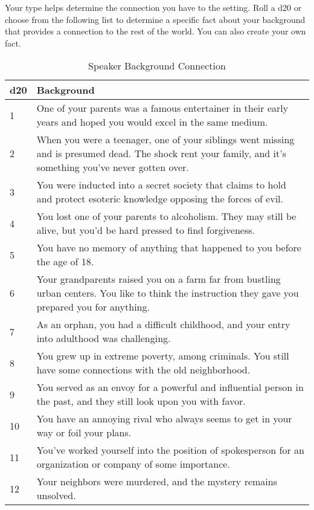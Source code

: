Your type helps determine the connection you have to the setting. Roll a d20 or choose from the following list to determine a specific fact about your background that provides a connection to the rest of the world. You can also create your own fact.

\begin{table*}
\centering

\caption{Speaker Background Connection}
\label{tab:Speaker Background Connection}

\begin{tabularx}{\textwidth}{| p{} | p{} |}
\hline
\textbf{d20} & \textbf{Background} \\
\hline
1 & One of your parents was a famous entertainer in their early years and hoped you would excel in the same medium. \\ \hline
2 & When you were a teenager, one of your siblings went missing and is presumed dead. The shock rent your family, and it’s something you’ve never gotten over. \\ \hline
3 & You were inducted into a secret society that claims to hold and protect esoteric knowledge opposing the forces of evil.  \\ \hline
4 & You lost one of your parents to alcoholism. They may still be alive, but you’d be hard pressed to find forgiveness.  \\ \hline
5 & You have no memory of anything that happened to you before the age of 18. \\ \hline
6 & Your grandparents raised you on a farm far from bustling urban centers. You like to think the instruction they gave you prepared you for anything. \\ \hline
7 & As an orphan, you had a difficult childhood, and your entry into adulthood was challenging. \\ \hline
8 & You grew up in extreme poverty, among criminals. You still have some connections with the old neighborhood.  \\ \hline
9 & You served as an envoy for a powerful and influential person in the past, and they still look upon you with favor.  \\ \hline
10 & You have an annoying rival who always seems to get in your way or foil your plans. \\ \hline
11 & You’ve worked yourself into the position of spokesperson for an organization or company of some importance.\\ \hline
12 & Your neighbors were murdered, and the mystery remains unsolved. \\ \hline

\end{tabularx}
\end{table*}
